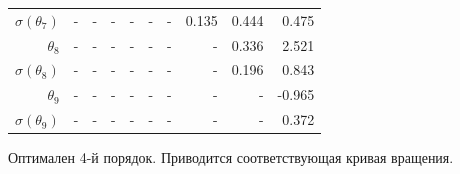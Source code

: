 \documentclass{matmex-diploma-custom}
\begin{document}
\begin{table}[h!!]
\begin{tabular}{r|rrr|r|rrrrr}
 $ \sigma(\theta_7)$&-     &    - &    - &    - &    - &    - &     0.135 &    0.444 &    0.475 \\
 $\theta_8$&-     &    - &    - &    - &    - &    - &    - &   0.336 &    2.521 \\
 $ \sigma(\theta_8)$&-     &    - &    - &    - &    - &    - &    - &    0.196 &    0.843 \\
 $\theta_9$&-     &    - &    - &    - &    - &    - &    - &    - &  -0.965  \\
 $ \sigma(\theta_9)$&-     &    - &    - &    - &    - &    - &    - &    - &   0.372  \\
\end{tabular}
\end{table}

Оптимален 4-й порядок. Приводится соответствующая кривая вращения.

%
%
%
%
\pagebreak
\end{document}
